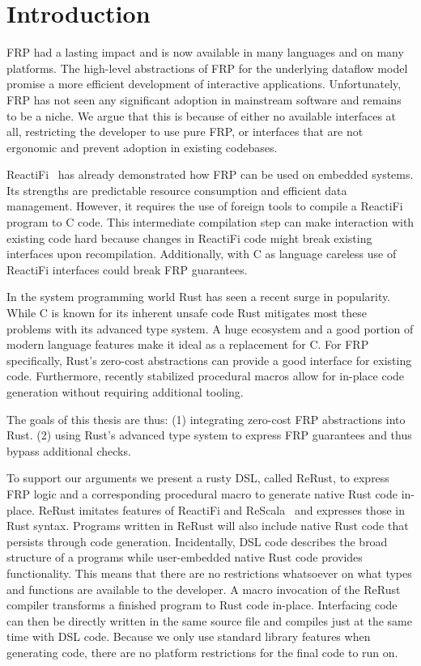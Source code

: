 \chapter{Introduction}
\label{introduction}

\ac{FRP} had a lasting impact and is now available in many languages and on many platforms. The high-level abstractions of \ac{FRP} for the underlying dataflow model promise a more efficient development of interactive applications. Unfortunately, \ac{FRP} has not seen any significant adoption in mainstream software and remains to be a niche. We argue that this is because of either no available interfaces at all, restricting the developer to use pure \ac{FRP}, or interfaces that are not ergonomic and prevent adoption in existing codebases.

\textsf{ReactiFi}~\citep{reactifi} has already demonstrated how \ac{FRP} can be used on embedded systems. Its strengths are predictable resource consumption and efficient data management. However, it requires the use of foreign tools to compile a \textsf{ReactiFi} program to C code. This intermediate compilation step can make interaction with existing code hard because changes in \textsf{ReactiFi} code might break existing interfaces upon recompilation. Additionally, with C as language careless use of \textsf{ReactiFi} interfaces could break \ac{FRP} guarantees. 

In the system programming world Rust has seen a recent surge in popularity. While C is known for its inherent unsafe code Rust mitigates most these problems with its advanced type system. A huge ecosystem and a good portion of modern language features make it ideal as a replacement for C. For \ac{FRP} specifically, Rust's zero-cost abstractions can provide a good interface for existing code. Furthermore, recently stabilized procedural macros allow for in-place code generation without requiring additional tooling.

The goals of this thesis are thus: (1) integrating zero-cost \ac{FRP} abstractions into Rust. (2) using Rust's advanced type system to express \ac{FRP} guarantees and thus bypass additional checks.

To support our arguments we present a rusty \ac{DSL}, called \textsf{ReRust}, to express \ac{FRP} logic and a corresponding procedural macro to generate native Rust code in-place. \textsf{ReRust} imitates features of \textsf{ReactiFi} and \textsf{ReScala}~\citep{rescala} and expresses those in Rust syntax. Programs written in \textsf{ReRust} will also include native Rust code that persists through code generation. Incidentally, \ac{DSL} code describes the broad structure of a programs while user-embedded native Rust code provides functionality. This means that there are no restrictions whatsoever on what types and functions are available to the developer. A macro invocation of the \textsf{ReRust} compiler transforms a finished program to Rust code in-place. Interfacing code can then be directly written in the same source file and compiles just at the same time with \ac{DSL} code. Because we only use standard library features when generating code, there are no platform restrictions for the final code to run on.

